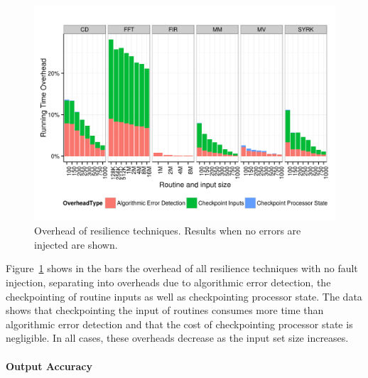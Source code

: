 \documentclass{sig-alternate}
\begin{document}
\begin{figure}[ht!]
\centering
\includegraphics[width=1.00\columnwidth]{figs/4_1_1_Overall_Breakdown.png}
\caption{Overhead of resilience techniques. Results when no errors are injected are shown.}
\label{fig:routine_all_ovhd}
\end{figure}

Figure~\ref{fig:routine_all_ovhd} shows in the bars the overhead of all resilience techniques with no fault injection, separating into overheads due to algorithmic error detection, the checkpointing of routine inputs as well as checkpointing processor state.
The data shows that checkpointing the input of routines consumes more time than algorithmic error detection and that the cost of checkpointing processor state is negligible. 
In all cases, these overheads decrease as the input set size increases.

\paragraph{Output Accuracy}
\end{document}

